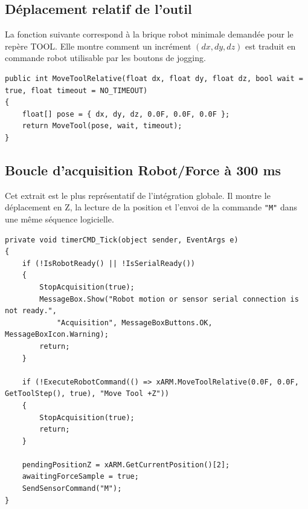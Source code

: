 \documentclass[11pt,a4paper]{article}
\begin{document}
\subsection{D\'eplacement relatif de l'outil}
La fonction suivante correspond \`a la brique robot minimale demand\'ee pour le rep\`ere TOOL. Elle montre comment un incr\'ement \((dx,dy,dz)\) est traduit en commande robot utilisable par les boutons de jogging.
\begin{lstlisting}
public int MoveToolRelative(float dx, float dy, float dz, bool wait = true, float timeout = NO_TIMEOUT)
{
    float[] pose = { dx, dy, dz, 0.0F, 0.0F, 0.0F };
    return MoveTool(pose, wait, timeout);
}
\end{lstlisting}

\subsection{Boucle d'acquisition Robot/Force \`a 300 ms}
Cet extrait est le plus repr\'esentatif de l'int\'egration globale. Il montre le d\'eplacement en Z, la lecture de la position et l'envoi de la commande \texttt{"M"} dans une m\^eme s\'equence logicielle.
\begin{lstlisting}
private void timerCMD_Tick(object sender, EventArgs e)
{
    if (!IsRobotReady() || !IsSerialReady())
    {
        StopAcquisition(true);
        MessageBox.Show("Robot motion or sensor serial connection is not ready.",
            "Acquisition", MessageBoxButtons.OK, MessageBoxIcon.Warning);
        return;
    }

    if (!ExecuteRobotCommand(() => xARM.MoveToolRelative(0.0F, 0.0F, GetToolStep(), true), "Move Tool +Z"))
    {
        StopAcquisition(true);
        return;
    }

    pendingPositionZ = xARM.GetCurrentPosition()[2];
    awaitingForceSample = true;
    SendSensorCommand("M");
}
\end{lstlisting}
\end{document}
